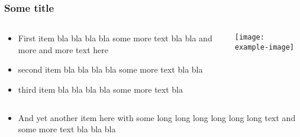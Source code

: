 \documentclass{beamer}
\begin{document}
\begin{frame}
\frametitle{Some title}
\setlength{\leftmargini}{0.5em}
\begin{columns}
    \begin{column}[T, onlytextwidth]{.45\textwidth}%
                \setlength{\partopsep}{0pt}%
        \begin{itemize}
        \itemsep 1.5em
            \item First item bla bla bla bla some more text bla bla and more and more text here
            \item second item bla bla bla bla some more text bla bla
            \item third item bla bla bla bla some more text bla
        \end{itemize}
    \end{column}%
    \begin{column}[T]{.45\textwidth}
        \texttt{[image: example-image]}
    \end{column}%
\end{columns}
\begin{itemize}
    \item And yet another item here with some long long long long long long text and some more text bla bla bla
\end{itemize}

\end{frame}
\end{document}
